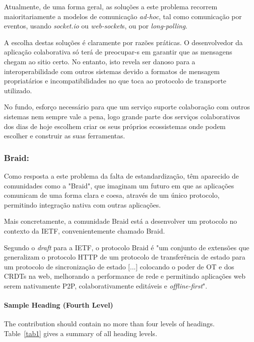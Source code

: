 \documentclass[runningheads]{llncs}
\begin{document}
        Atualmente, de uma forma geral, as soluções a este problema recorrem
        maioritariamente a modelos de comunicação {\itshape ad-hoc}, tal como
        comunicação por eventos, usando {\itshape socket.io} ou {\itshape
        web-socket}s, ou por {\itshape long-polling}. 

        A escolha destas soluções é claramente por razões práticas. O
        desenvolvedor da aplicação colaborativa só terá de preocupar-s em
        garantir que as mensagens chegam ao sitio certo. No entanto, isto revela
        ser danoso para a interoperabilidade com outros sistemas devido a
        formatos de mensagem propriatários e incompatibilidades no que toca ao
        protocolo de transporte utilizado. 
        
        No fundo, esforço necessário para que um serviço suporte colaboração com
        outros sistemas nem sempre vale a pena, logo grande parte dos serviços
        colaborativos dos dias de hoje escolhem criar os seus próprios
        ecossistemas onde podem escolher e construir as suas ferramentas.


            \subsubsection{Braid:} Como resposta a este problema da falta de
            estandardização, têm aparecido de comunidades como a "Braid", que
            imaginam um futuro em que as aplicações comunicam de uma forma clara
            e coesa, através de um único protocolo, permitindo integração nativa
            com outras aplicações.

            Mais concretamente, a comunidade Braid está a desenvolver um
            protocolo no contexto da IETF, convenientemente chamado Braid. 

            Segundo o {\itshape draft} para a IETF, o protocolo Braid é "um
            conjunto de extensões que generalizam o protocolo HTTP de um
            protocolo de transferência de estado para um protocolo de
            sincronização de estado [...] colocando o poder de OT e dos CRDTs na
            web, melhorando a performance de rede e permitindo aplicações web
            serem nativamente P2P, colaborativamente editáveis e {\itshape
            offline-first}"\cite{braid-spec}. 


        \paragraph{Sample Heading (Fourth Level)}
        The contribution should contain no more than four levels of headings.
        Table~\ref{tab1} gives a summary of all heading levels.
\end{document}

